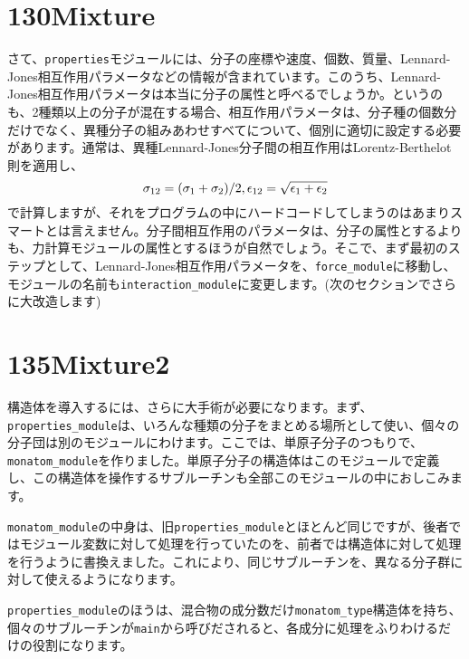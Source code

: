\documentclass[a4,10pt]{article}
\begin{document}
\section{130Mixture}

さて、{\tt properties}モジュールには、分子の座標や速度、個数、質量、Lennard-Jones相互作用パラメータなどの情報が含まれています。このうち、Lennard-Jones相互作用パラメータは本当に分子の属性と呼べるでしょうか。というのも、2種類以上の分子が混在する場合、相互作用パラメータは、分子種の個数分だけでなく、異種分子の組みあわせすべてについて、個別に適切に設定する必要があります。通常は、異種Lennard-Jones分子間の相互作用はLorentz-Berthelot則を適用し、
\begin{equation}
 \sigma_{12} = (\sigma_1+\sigma_2)/2,\\
 \epsilon_{12} = \sqrt{\epsilon_1 + \epsilon_2}
 \end{equation}
で計算しますが、それをプログラムの中にハードコードしてしまうのはあまりスマートとは言えません。分子間相互作用のパラメータは、分子の属性とするよりも、力計算モジュールの属性とするほうが自然でしょう。そこで、まず最初のステップとして、Lennard-Jones相互作用パラメータを、{\tt force\_module}に移動し、モジュールの名前も{\tt interaction\_module}に変更します。(次のセクションでさらに大改造します)

\section{135Mixture2}

構造体を導入するには、さらに大手術が必要になります。まず、{\tt properties\_module}は、いろんな種類の分子をまとめる場所として使い、個々の分子団は別のモジュールにわけます。ここでは、単原子分子のつもりで、{\tt monatom\_module}を作りました。単原子分子の構造体はこのモジュールで定義し、この構造体を操作するサブルーチンも全部このモジュールの中におしこみます。

{\tt monatom\_module}の中身は、旧{\tt properties\_module}とほとんど同じですが、後者ではモジュール変数に対して処理を行っていたのを、前者では構造体に対して処理を行うように書換えました。これにより、同じサブルーチンを、異なる分子群に対して使えるようになります。

{\tt properties\_module}のほうは、混合物の成分数だけ{\tt monatom\_type}構造体を持ち、個々のサブルーチンが{\tt main}から呼びだされると、各成分に処理をふりわけるだけの役割になります。
\end{document}
